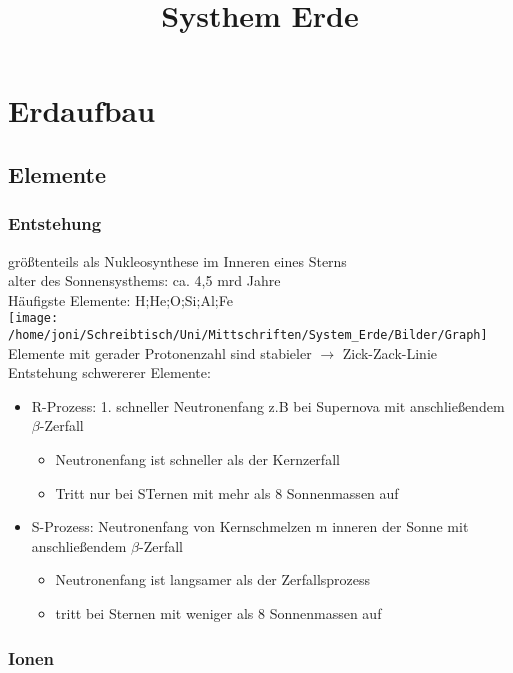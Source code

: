 \documentclass[a4,12pt]{scrreprt}
\begin{document}
\title{Systhem Erde} \label{sec:Systhem Erde}
\maketitle

\tableofcontents
\newpage

\chapter{Erdaufbau}
\section{Elemente}
\subsection{Entstehung}
größtenteils als Nukleosynthese im Inneren eines Sterns\\
alter des Sonnensysthems: ca. 4,5 mrd Jahre\\
Häufigste Elemente: H;He;O;Si;Al;Fe\\

\texttt{[image: /home/joni/Schreibtisch/Uni/Mittschriften/System\_Erde/Bilder/Graph]}\\

Elemente mit gerader Protonenzahl sind stabieler $\rightarrow$ Zick-Zack-Linie\\
Entstehung schwererer Elemente:
\begin{itemize}
\item R-Prozess: 1. schneller Neutronenfang z.B bei Supernova mit anschließendem $\beta$-Zerfall
\begin{itemize}
\item Neutronenfang ist schneller als der Kernzerfall
\item Tritt nur bei STernen mit mehr als 8 Sonnenmassen auf
\end{itemize}
\item S-Prozess: Neutronenfang von Kernschmelzen m inneren der Sonne mit anschließendem $\beta$-Zerfall
\begin{itemize}
\item Neutronenfang ist langsamer als der Zerfallsprozess
\item tritt bei Sternen mit weniger als 8 Sonnenmassen auf
\end{itemize}
\end{itemize}

\subsection{Ionen} \label{sec:Ionen}
\end{document}

